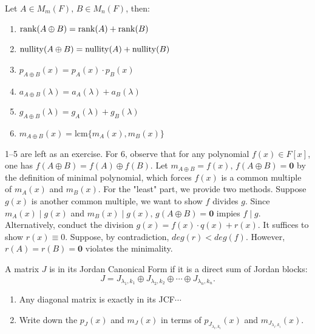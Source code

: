 \begin{theorem}
     Let $A\in M_m(F),\,B\in M_n(F)$, then:
     \begin{enumerate}
        \item $\operatorname{rank}(A\oplus B) = \operatorname{rank}(A)+\operatorname{rank}(B)$
        \item $\operatorname{nullity}(A\oplus B) = \operatorname{nullity}(A)+\operatorname{nullity}(B)$
        \item $p_{A\oplus B}(x)=p_A(x)\cdot p_B(x)$
        \item $a_{A\oplus B}(\lambda)=a_A(\lambda)+a_B(\lambda)$
        \item $g_{A\oplus B}(\lambda)=g_A(\lambda)+g_B(\lambda)$
        \item $m_{A\oplus B}(x)=\text{lcm}\{m_A(x), m_B(x)\}$
     \end{enumerate}
\end{theorem}


\begin{pfbox}
    1--5 are left as an exercise. 
    For 6, observe that for any polynomial $f(x)\in F[x]$, one has $f(A\oplus B)=f(A)\oplus f(B)$.
    Let $m_{A\oplus B}=f(x),\, f(A\oplus B)=\mathbf{0}$ by the definition of minimal polynomial, which forces $f(x)$ is a common multiple of $m_A(x)$ and $m_B(x).$ 
    For the "least" part, we provide two methods. Suppose $g(x)$ is another common multiple, we want to show $f$ divides $g$.
    Since $m_A(x)\mid g(x)$ and $m_B(x)\mid g(x),\, g(A\oplus B) = \mathbf{0}$ impies $f\mid g.$ \\

    Alternatively, conduct the division $g(x)=f(x)\cdot q(x)+r(x).$ It suffices to show $r(x)\equiv 0.$
    Suppose, by contradiction, $deg(r)<deg(f).$ However,$r(A)=r(B)=\mathbf{0}$ violates the minimality.
\end{pfbox}




\begin{definition}[JCF]
    A matrix $J$ is in its Jordan Canonical Form if it is a direct sum of Jordan blocks:
    \[J=J_{\lambda_1,k_1}\oplus J_{\lambda_2,k_2}\oplus\cdots\oplus J_{\lambda_n,k_n}.\]
\end{definition}

\begin{corollary}
    \begin{enumerate}
        \item Any diagonal matrix is exactly in its JCF$\cdots$
        \item Write down the $p_J(x)$ and $m_J(x)$ in terms of $p_{J_{\lambda_i, k_i}}(x)$ and $m_{J_{\lambda_i, k_i}}(x)$.
    \end{enumerate}
\end{corollary}


